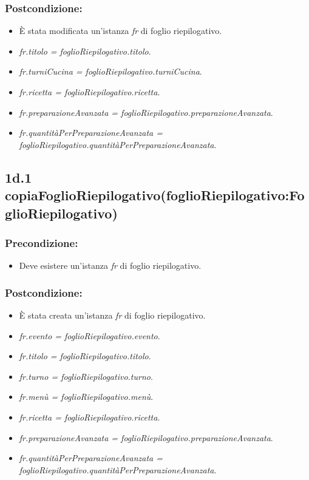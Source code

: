\subsubsection*{Postcondizione:}
\begin{itemize}
    \item È stata modificata un'istanza \textit{fr} di foglio riepilogativo.
    \item \textit{fr.titolo = foglioRiepilogativo.titolo}.
    \item \textit{fr.turniCucina = foglioRiepilogativo.turniCucina}.
    \item \textit{fr.ricetta = foglioRiepilogativo.ricetta}.
    \item \textit{fr.preparazioneAvanzata = foglioRiepilogativo.preparazioneAvanzata}.
    \item \textit{fr.quantitàPerPreparazioneAvanzata = foglioRiepilogativo.quantitàPerPreparazioneAvanzata}.
\end{itemize}

\subsection*{1d.1 copiaFoglioRiepilogativo(foglioRiepilogativo:FoglioRiepilogativo)}

\subsubsection*{Precondizione:}
\begin{itemize}
    \item Deve esistere un'istanza \textit{fr} di foglio riepilogativo.
\end{itemize}

\subsubsection*{Postcondizione:}
\begin{itemize}
    \item È stata creata un'istanza \textit{fr} di foglio riepilogativo.
    \item \textit{fr.evento = foglioRiepilogativo.evento}.
    \item \textit{fr.titolo = foglioRiepilogativo.titolo}.
    \item \textit{fr.turno = foglioRiepilogativo.turno}.
    \item \textit{fr.menù = foglioRiepilogativo.menù}.
    \item \textit{fr.ricetta = foglioRiepilogativo.ricetta}.
    \item \textit{fr.preparazioneAvanzata = foglioRiepilogativo.preparazioneAvanzata}.
    \item \textit{fr.quantitàPerPreparazioneAvanzata = foglioRiepilogativo.quantitàPerPreparazioneAvanzata}.
\end{itemize}

